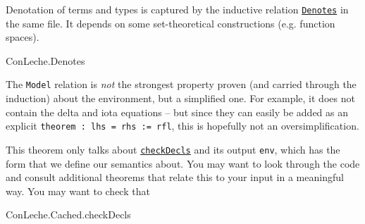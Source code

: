 \documentclass{article}
\newcommand\code[1]{\texttt{#1}}
\begin{document}
Denotation of terms and types is captured by the inductive relation \href{https://github.com/leanprover/con-leche/blob/master/ConLeche/Denotes.lean#L123-L124}{\code{Denotes}} in the same file. It depends on some set-theoretical constructions (e.g. function spaces).

\begin{leanblock}[view=lean, sum=ucRzn2CvLG]{ConLeche.Denotes}{}
\end{leanblock}

The \code{Model} relation is \emph{not} the strongest property proven (and carried through the induction) about the environment, but a simplified one. For example, it does not contain the delta and iota equations – but since they can easily be added as an explicit \code{theorem : lhs = rhs := rfl}, this is hopefully not an oversimplification.

This theorem only talks about \href{https://github.com/leanprover/con-leche/blob/master/ConLeche/Cached/Installed.lean#L329-L334}{\code{checkDecls}} and its output \code{env}, which has the form that we define our semantics about. You may want to look through the code and consult additional theorems that relate this to your input in a meaningful way. You may want to check that

\begin{leanblock}[view=lean, sum=1aXqqVvB_x]{ConLeche.Cached.checkDecls}{}
\end{leanblock}
\end{document}
